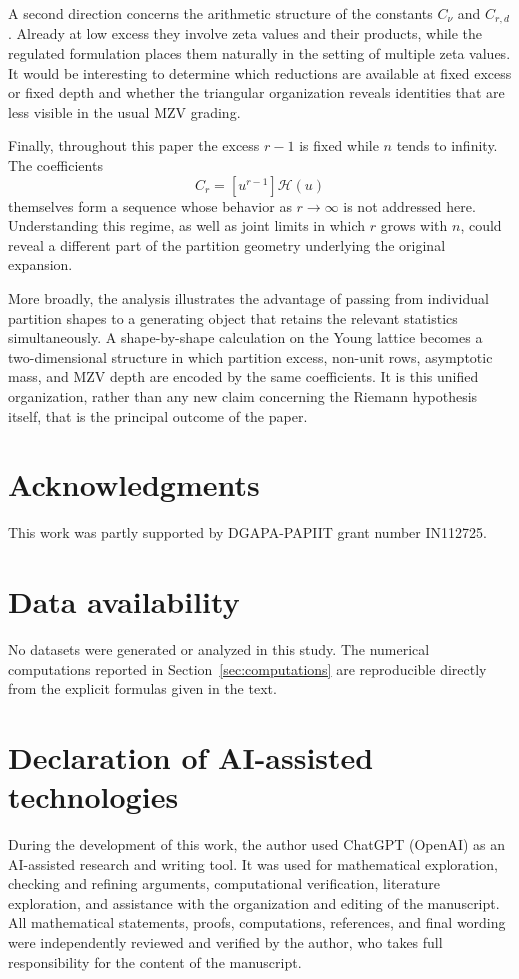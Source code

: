 \documentclass[11pt]{article}
\theoremstyle{definition}
\begin{document}
A second direction concerns the arithmetic structure of the
constants $C_\nu$ and $C_{r,d}$.  Already at low excess they involve
zeta values and their products, while the regulated formulation
places them naturally in the setting of multiple zeta values.  It
would be interesting to determine which reductions are available at
fixed excess or fixed depth and whether the triangular organization
reveals identities that are less visible in the usual MZV grading.

Finally, throughout this paper the excess $r-1$ is fixed while $n$
tends to infinity.  The coefficients
\[
        C_r=[u^{r-1}]\mathcal H(u)
\]
themselves form a sequence whose behavior as $r\to\infty$ is not
addressed here.  Understanding this regime, as well as joint limits
in which $r$ grows with $n$, could reveal a different part of the
partition geometry underlying the original expansion.

More broadly, the analysis illustrates the advantage of passing from
individual partition shapes to a generating object that retains the
relevant statistics simultaneously.  A shape-by-shape calculation
on the Young lattice becomes a two-dimensional structure in which
partition excess, non-unit rows, asymptotic mass, and MZV depth are
encoded by the same coefficients.  It is this unified organization,
rather than any new claim concerning the Riemann hypothesis itself,
that is the principal outcome of the paper.


\section*{Acknowledgments}
This work was partly supported by DGAPA-PAPIIT grant number IN112725.

\section*{Data availability}

No datasets were generated or analyzed in this study.
The numerical computations reported in Section~\ref{sec:computations}
are reproducible directly from the explicit formulas given in the text.

\section*{Declaration of AI-assisted technologies}

During the development of this work, the author used ChatGPT
(OpenAI) as an AI-assisted research and writing tool.  It was used
for mathematical exploration, checking and refining arguments,
computational verification, literature exploration, and assistance
with the organization and editing of the manuscript.  All mathematical
statements, proofs, computations, references, and final wording were
independently reviewed and verified by the author, who takes full
responsibility for the content of the manuscript.
\end{document}
